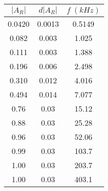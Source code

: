 \begin{tabular}{cc|c}
\toprule
$|A_{R}|$ & $d|A_{R}|$ & $f \; (kHz)$ \\
\midrule
 0.0420 & 0.0013 &   0.5149 \\
 0.082 &  0.003 &    1.025 \\
 0.111 &  0.003 &    1.388 \\
 0.196 &  0.006 &    2.498 \\
 0.310 &  0.012 &    4.016 \\
 0.494 &  0.014 &    7.077 \\
 0.76 &   0.03 &     15.12 \\
 0.88 &   0.03 &     25.28 \\
 0.96 &   0.03 &     52.06 \\
 0.99 &   0.03 &     103.7 \\
 1.00 &   0.03 &     203.7 \\
 1.00 &   0.03 &     403.1 \\
\bottomrule
\end{tabular}
